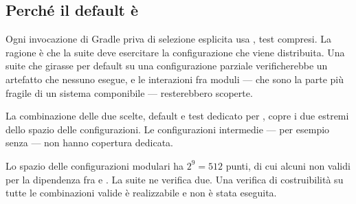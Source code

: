 \subsection{Perch\'e il default \`e }

Ogni invocazione di Gradle priva di selezione esplicita usa , test
compresi. La ragione \`e che la suite deve esercitare la configurazione che viene
distribuita. Una suite che girasse per default su una configurazione parziale
verificherebbe un artefatto che nessuno esegue, e le interazioni fra moduli ---
che sono la parte pi\`u fragile di un sistema componibile --- resterebbero
scoperte.

La combinazione delle due scelte, default  e test dedicato per
, copre i due estremi dello spazio delle configurazioni. Le
configurazioni intermedie --- per esempio  senza
 --- non hanno copertura dedicata.

\begin{damisurare}
Lo spazio delle configurazioni modulari ha $2^9 = 512$ punti, di cui alcuni non
validi per la dipendenza fra  e . La
suite ne verifica due. Una verifica di costruibilit\`a su tutte le combinazioni
valide \`e realizzabile e non \`e stata eseguita.
\end{damisurare}
